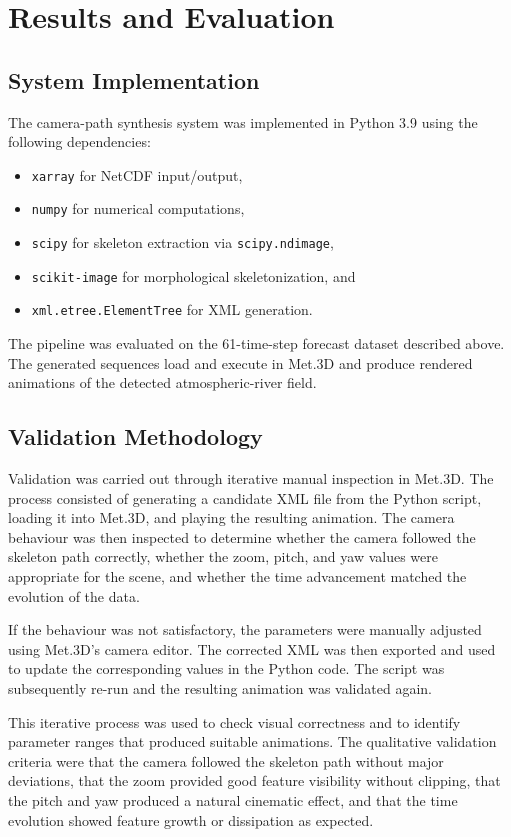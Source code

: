 \documentclass[journal abbreviation, manuscript]{copernicus}
\begin{document}
\section{Results and Evaluation}

\subsection{System Implementation}

The camera-path synthesis system was implemented in Python 3.9 using the following dependencies:
\begin{itemize}
\item \texttt{xarray} for NetCDF input/output,
\item \texttt{numpy} for numerical computations,
\item \texttt{scipy} for skeleton extraction via \texttt{scipy.ndimage},
\item \texttt{scikit-image} for morphological skeletonization, and
\item \texttt{xml.etree.ElementTree} for XML generation.
\end{itemize}

The pipeline was evaluated on the 61-time-step forecast dataset described above. The generated sequences load and execute in Met.3D and produce rendered animations of the detected atmospheric-river field.

\subsection{Validation Methodology}

Validation was carried out through iterative manual inspection in Met.3D. The process consisted of generating a candidate XML file from the Python script, loading it into Met.3D, and playing the resulting animation. The camera behaviour was then inspected to determine whether the camera followed the skeleton path correctly, whether the zoom, pitch, and yaw values were appropriate for the scene, and whether the time advancement matched the evolution of the data.

If the behaviour was not satisfactory, the parameters were manually adjusted using Met.3D's camera editor. The corrected XML was then exported and used to update the corresponding values in the Python code. The script was subsequently re-run and the resulting animation was validated again.

This iterative process was used to check visual correctness and to identify parameter ranges that produced suitable animations. The qualitative validation criteria were that the camera followed the skeleton path without major deviations, that the zoom provided good feature visibility without clipping, that the pitch and yaw produced a natural cinematic effect, and that the time evolution showed feature growth or dissipation as expected.
\end{document}
